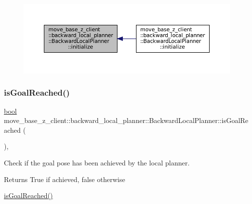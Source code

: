 \nopagebreak
\begin{figure}[H]
\begin{center}
\leavevmode
\includegraphics[width=350pt]{classmove__base__z__client_1_1backward__local__planner_1_1BackwardLocalPlanner_acdb083587fd77dc2c8d617751ac08f74_icgraph}
\end{center}
\end{figure}
\mbox{\label{classmove__base__z__client_1_1backward__local__planner_1_1BackwardLocalPlanner_a625198f20113c62e95ffaa82ecc3f472}} 
\subsubsection{\texorpdfstring{is\+Goal\+Reached()}{isGoalReached()}}
{\footnotesize\ttfamily \hyperlink{classbool}{bool} move\+\_\+base\+\_\+z\+\_\+client\+::backward\+\_\+local\+\_\+planner\+::\+Backward\+Local\+Planner\+::is\+Goal\+Reached (\begin{DoxyParamCaption}{ }\end{DoxyParamCaption})\hspace{0.3cm}{\ttfamily [override]}, {\ttfamily [virtual]}}



Check if the goal pose has been achieved by the local planner. 

\begin{DoxyReturn}{Returns}
True if achieved, false otherwise
\end{DoxyReturn}
\hyperlink{classmove__base__z__client_1_1backward__local__planner_1_1BackwardLocalPlanner_a625198f20113c62e95ffaa82ecc3f472}{is\+Goal\+Reached()} 

